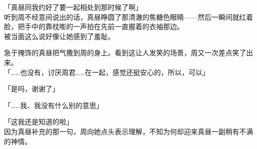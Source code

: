 「真昼同我约好了要一起相处到那时候了啊」\\

听到周不经意间说出的话，真昼睁圆了那清澈的焦糖色眼睛——然后一瞬间就红着脸，把手中的靠枕嘭的一声拍在先前一直握着的衣袖那边。\\

被当面这么说好像让她感到了羞耻。

急于掩饰的真昼把气撒到周的身上。看到这让人发笑的场景，周又一次差点笑了出来。\\

「……也没有，讨厌周君……在一起，感觉还挺安心的，所以，可以」

「是吗，谢谢了」

「……我、我没有什么别的意思」

「这我还是知道的啦」\\

因为真昼补充的那一句，周向她点头表示理解，不知为何却迎来真昼一副稍有不满的神情。

